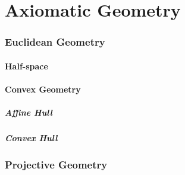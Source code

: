 \part{Axiomatic Geometry}\label{sec:axiomatic_geometry}

\section{Euclidean Geometry}\label{sec:euclidean_geometry}

\subsection{Half-space}\label{sec:half_space}

\subsection{Convex Geometry}\label{sec:convex_geometry}

\subsubsection{Affine Hull}\label{sec:affine_hull}

\subsubsection{Convex Hull}\label{sec:convex_hull}



\section{Projective Geometry}\label{sec:projective_geometry}


